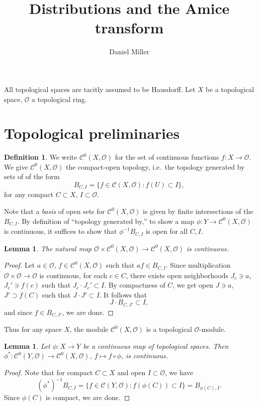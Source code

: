 \documentclass{article}
\title{Distributions and the Amice transform}
\author{Daniel Miller}
\newcommand{\cO}{\mathcal{O}}
\newcommand{\sC}{\mathscr{C}}
\newtheorem{lemma}[subsection]{Lemma}
\theoremstyle{definition}
\newtheorem{definition}[subsection]{Definition}
\begin{document}
\maketitle





All topological spaces are tacitly assumed to be Hausdorff. Let $X$ be a 
topological space, $\cO$ a topological ring. 





\section{Topological preliminaries}

\begin{definition}
We write $\sC^0(X,\cO)$ for the set of continuous functions $f\colon X\to\cO$. 
We give $\sC^0(X,\cO)$ the compact-open topology, i.e.~the topology generated 
by sets of of the form
\[
  B_{C,I} = \{f\in \sC(X,\cO)\colon f(U)\subset I\} ,
\]
for any compact $C\subset X$, $I\subset \cO$. 
\end{definition}

Note that a \emph{basis} of open sets for $\sC^0(X,\cO)$ is given by finite 
intersections of the $B_{C,I}$. By definition of ``topology generated by,'' to 
show a map $\phi\colon Y\to \sC^0(X,\cO)$ is continuous, it suffices to show 
that $\phi^{-1} B_{C,I}$ is open for all $C,I$. 

\begin{lemma}
The natural map $\cO\times \sC^0(X,\cO)\to \sC^0(X,\cO)$ is continuous. 
\end{lemma}
\begin{proof}
Let $a\in \cO$, $f\in \sC^0(X,\cO)$ such that $a f\in B_{C,I}$. Since 
multiplication $\cO\times \cO\to \cO$ is continuous, for each $c\in C$, there 
exists open neighborhoods $J_c\ni a$, $J_c'\ni f(c)$ such that 
$J_c\cdot J_c'\subset I$. By compactness of $C$, we get open $J\ni a$, 
$J'\supset f(C)$ such that $J\cdot J'\subset I$. It follows that 
\[
  J\cdot B_{C,J'}\subset I ,
\]
and since $f\in B_{C,J'}$, we are done. 
\end{proof}

Thus for any space $X$, the module $\sC^0(X,\cO)$ is a topological 
$\cO$-module. 

\begin{lemma}
Let $\phi\colon X\to Y$ be a continuous map of topological spaces. Then 
$\phi^\ast\colon \sC^0(Y,\cO)\to \sC^0(X,\cO)$, $f\mapsto f\circ\phi$, is 
continuous. 
\end{lemma}
\begin{proof}
Note that for compact $C\subset X$ and open $I\subset \cO$, we have 
\[
  (\phi^\ast)^{-1} B_{C,I} 
    = \{f\in\sC(Y,\cO)\colon f(\phi(C))\subset I\} 
    = B_{\phi(C),I} .
\]
Since $\phi(C)$ is compact, we are done. 
\end{proof}
\end{document}
